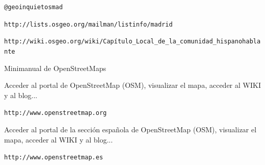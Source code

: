 \documentclass[11pt,a5]{article}
\newcommand{\web}[1]{\texttt{\color{VerdeOscuro2!50!black}\large #1}}
\begin{document}
\begin{center}
\begin{minipage}{0.3\textwidth}
  \begin{center} \large
    \begin{mdframed}[style=CajaContactos, frametitle={\Large\color{green!10!white} Twitter}]
      \web{@geoinquietosmad}
    \end{mdframed}
  \end{center}
\end{minipage}
%
\begin{minipage}{0.65\textwidth}
  \begin{center} \large
    \begin{mdframed}[style=CajaContactos, frametitle={\Large\color{green!10!white} Lista de correo}]
      \web{http://lists.osgeo.org/mailman/listinfo/madrid}
    \end{mdframed}
  \end{center}
\end{minipage}

\begin{minipage}{0.9\textwidth}
\begin{center} \large
    \begin{mdframed}[style=CajaContactos, frametitle={\Large\color{green!10!white} Wiki}]
      \web{http://wiki.osgeo.org/wiki/Capítulo\_Local\_de\_la\_comunidad\_hispanohablante}
    \end{mdframed}
  \end{center}
\end{minipage}
\end{center}

\newpage



\begin{center}
\color{VerdeOscuro2!50!black}\Huge Minimanual de OpenStreetMaps
\end{center}

\begin{mdframed}[style=Caja, frametitle={\Large\color{green!10!white}Portal OpenStreetMap}]
     Acceder al portal de OpenStreetMap (OSM), visualizar el mapa,
    acceder al WIKI y al blog... 

    \web{http://www.openstreetmap.org}
\end{mdframed}

\begin{mdframed}[style=Caja, frametitle={\Large\color{green!10!white}Sección española de OpenStreetMap}]
Acceder al portal de la sección española de OpenStreetMap (OSM), visualizar el
mapa, acceder al WIKI y al blog...

\web{http://www.openstreetmap.es}
\end{mdframed}
\end{document}
